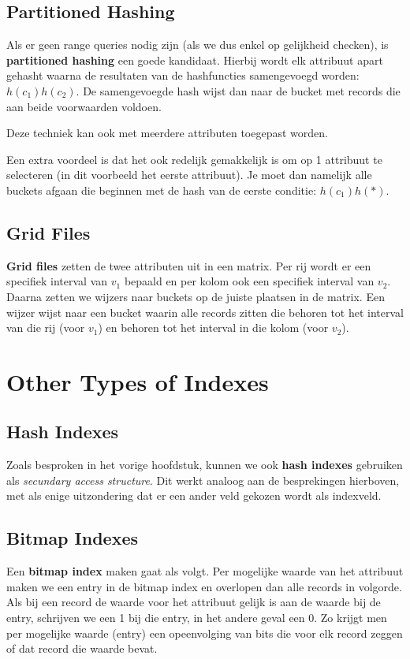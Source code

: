 \subsection{Partitioned Hashing}
Als er geen range queries nodig zijn (als we dus enkel op gelijkheid checken), is \textbf{partitioned hashing} een goede kandidaat. Hierbij wordt elk attribuut apart gehasht waarna de resultaten van de hashfuncties samengevoegd worden: $h(c_1)h(c_2)$. De samengevoegde hash wijst dan naar de bucket met records die aan beide voorwaarden voldoen.

Deze techniek kan ook met meerdere attributen toegepast worden.

Een extra voordeel is dat het ook redelijk gemakkelijk is om op 1 attribuut te selecteren (in dit voorbeeld het eerste attribuut). Je moet dan namelijk alle buckets afgaan die beginnen met de hash van de eerste conditie: $h(c_1)h(*)$.


\subsection{Grid Files}
\textbf{Grid files} zetten de twee attributen uit in een matrix. Per rij wordt er een specifiek interval van $v_1$ bepaald en per kolom ook een specifiek interval van $v_2$. Daarna zetten we wijzers naar buckets op de juiste plaatsen in de matrix. Een wijzer wijst naar een bucket waarin alle records zitten die behoren tot het interval van die rij (voor $v_1$) en behoren tot het interval in die kolom (voor $v_2$).



\section{Other Types of Indexes}
\subsection{Hash Indexes}
Zoals besproken in het vorige hoofdstuk, kunnen we ook \textbf{hash indexes} gebruiken als \textit{secundary access structure}. Dit werkt analoog aan de besprekingen hierboven, met als enige uitzondering dat er een ander veld gekozen wordt als indexveld.


\subsection{Bitmap Indexes}
Een \textbf{bitmap index} maken gaat als volgt. Per mogelijke waarde van het attribuut maken we een entry in de bitmap index en overlopen dan alle records in volgorde. Als bij een record de waarde voor het attribuut gelijk is aan de waarde bij de entry, schrijven we een 1 bij die entry, in het andere geval een 0. Zo krijgt men per mogelijke waarde (entry) een opeenvolging van bits die voor elk record zeggen of dat record die waarde bevat.

